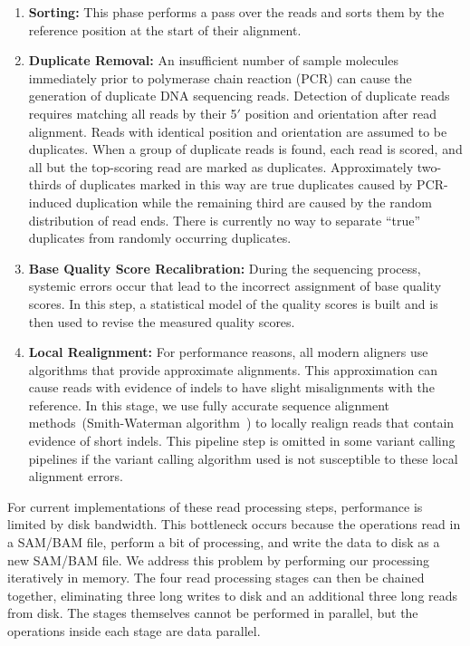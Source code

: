 \documentclass[10pt,twocolumn]{article}
\theoremstyle{plain}
\begin{document}
\begin{enumerate}
\item {\bf Sorting:}
\label{sec:sorting}
This phase performs a pass over the reads and sorts them by the reference position at the start of their alignment.

\item {\bf Duplicate Removal:} 
\label{sec:duplicate-removal}
An insufficient number of sample molecules immediately prior to polymerase chain reaction (PCR) can cause the generation of duplicate DNA sequencing reads.
Detection of duplicate reads requires matching all reads by their 5$'$ position and orientation after read alignment. Reads with
identical position and orientation are assumed to be duplicates. When a group of duplicate reads is found, each read is scored,
and all but the top-scoring read are marked as duplicates. Approximately two-thirds of duplicates marked in this way are true
duplicates caused by PCR-induced duplication while the remaining third are caused by the random distribution of read ends\cite{20565776}.
There is currently no way to separate ``true'' duplicates from randomly occurring duplicates.

\item {\bf Base Quality Score Recalibration:} 
\label{sec:bqsr}
During the sequencing process, systemic errors occur that lead to the incorrect assignment of base quality scores. In this step, a
statistical model of the quality scores is built and is then used to revise the measured quality scores.

\item {\bf Local Realignment:} 
\label{sec:local-realignment}
For performance reasons, all modern aligners use algorithms that provide approximate alignments. This approximation can cause reads with
evidence of indels to have slight misalignments with the reference. In this stage, we use fully accurate sequence alignment
methods~(Smith-Waterman algorithm~\cite{smith81}) to locally realign reads that contain evidence of short indels. This pipeline
step is omitted in some variant calling pipelines if the variant calling algorithm used is not susceptible to these
local alignment errors.
\end{enumerate}

For current implementations of these read processing steps, performance is limited by disk bandwidth. This bottleneck occurs  because the operations
read in a SAM/BAM file, perform a bit of processing, and write the data to disk as a new SAM/BAM file. We address this problem by performing
our processing iteratively in memory. The four read processing stages can then be chained together, eliminating three long writes to
disk and an additional three long reads from disk. The stages themselves cannot be performed in parallel, but the operations inside each
stage are data parallel. 
\end{document}
